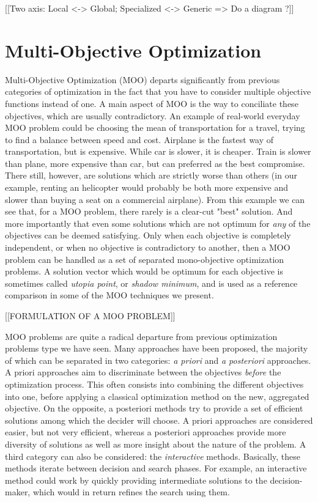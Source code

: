 [[Two axis: Local <-> Global; Specialized <-> Generic => Do a diagram ?]]

\chapter{Multi-Objective Optimization}

Multi-Objective Optimization (MOO) departs significantly from previous categories of optimization in the fact that you have to consider multiple objective functions instead of one. A main aspect of MOO is the way to conciliate these objectives, which are usually contradictory.
An example of real-world everyday MOO problem could be choosing the mean of transportation for a travel, trying to find a balance between speed and cost. Airplane is the fastest way of transportation, but is expensive. While car is slower, it is cheaper. Train is slower than plane, more expensive than car, but can preferred as the best compromise. There still, however, are solutions which are strictly worse than others (in our example, renting an helicopter would probably be both more expensive and slower than buying a seat on a commercial airplane).
From this example we can see that, for a MOO problem, there rarely is a clear-cut "best" solution. And more importantly that even some solutions which are not optimum for \emph{any} of the objectives can be deemed satisfying. Only when each objective is completely independent, or when no objective is contradictory to another, then a MOO problem can be handled as a set of separated mono-objective optimization problems.
A solution vector which would be optimum for each objective is sometimes called \emph{utopia point}, or \emph{shadow minimum}, and is used as a reference comparison in some of the MOO techniques we present.

[[FORMULATION OF A MOO PROBLEM]]

MOO problems are quite a radical departure from previous optimization problems type we have seen. Many approaches have been proposed, the majority of which can be separated in two categories: \emph{a priori} and \emph{a posteriori} approaches. A priori approaches aim to discriminate between the objectives \emph{before} the optimization process. This often consists into combining the different objectives into one, before applying a classical optimization method on the new, aggregated objective.
On the opposite, a posteriori methods try to provide a set of efficient solutions among which the decider will choose.
A priori approaches are considered easier, but not very efficient, whereas a posteriori approaches provide more diversity of solutions as well as more insight about the nature of the problem.
A third category can also be considered: the \emph{interactive} methods. Basically, these methods iterate between decision and search phases. For example, an interactive  method could work by quickly providing intermediate solutions to the decision-maker, which would in return refines the search using them.


